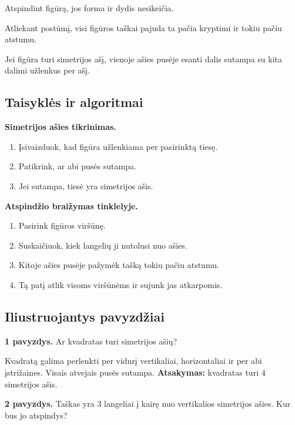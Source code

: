 \begin{savybe}
Atspindint figūrą, jos forma ir dydis nesikeičia.
\end{savybe}

\begin{savybe}
Atliekant postūmį, visi figūros taškai pajuda ta pačia kryptimi ir tokiu pačiu atstumu.
\end{savybe}

\begin{savybe}
Jei figūra turi simetrijos ašį, vienoje ašies pusėje esanti dalis sutampa su kita dalimi užlenkus per ašį.
\end{savybe}

\subsection{Taisyklės ir algoritmai}

\textbf{Simetrijos ašies tikrinimas.}
\begin{enumerate}[label=\arabic*.]
\item Įsivaizduok, kad figūra užlenkiama per pasirinktą tiesę.
\item Patikrink, ar abi pusės sutampa.
\item Jei sutampa, tiesė yra simetrijos ašis.
\end{enumerate}

\textbf{Atspindžio braižymas tinklelyje.}
\begin{enumerate}[label=\arabic*.]
\item Pasirink figūros viršūnę.
\item Suskaičiuok, kiek langelių ji nutolusi nuo ašies.
\item Kitoje ašies pusėje pažymėk tašką tokiu pačiu atstumu.
\item Tą patį atlik visoms viršūnėms ir sujunk jas atkarpomis.
\end{enumerate}

\subsection{Iliustruojantys pavyzdžiai}

\textbf{1 pavyzdys.} Ar kvadratas turi simetrijos ašių?

Kvadratą galima perlenkti per vidurį vertikaliai, horizontaliai ir per abi įstrižaines. Visais atvejais pusės sutampa.
\textbf{Atsakymas:} kvadratas turi \(4\) simetrijos ašis.

\textbf{2 pavyzdys.} Taškas yra \(3\) langeliai į kairę nuo vertikalios simetrijos ašies. Kur bus jo atspindys?

